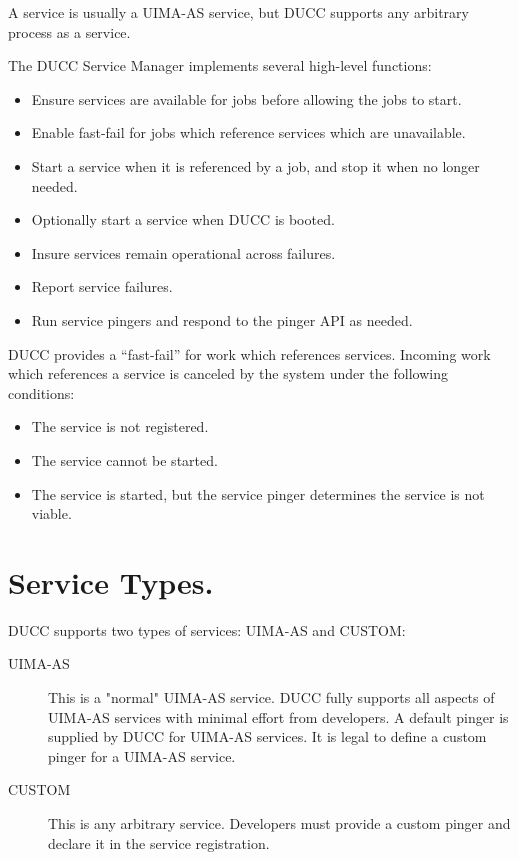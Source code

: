      A service is usually a UIMA-AS service, but DUCC supports any arbitrary process as a service.

      The DUCC Service Manager implements several high-level functions:
      
      \begin{itemize}
          \item Ensure services are available for jobs before allowing the jobs to start.
          \item Enable fast-fail for jobs which reference services which are unavailable.
          \item Start a service when it is referenced by a job, and stop it when no longer needed.
          \item Optionally start a service when DUCC is booted.
          \item Insure services remain operational across failures.
          \item Report service failures.
          \item Run service pingers and respond to the pinger API as needed.
       \end{itemize}

       DUCC provides a ``fast-fail'' for work which references services.  Incoming work which
       references a service is canceled by the system under the following conditions:
       \begin{itemize}
         \item The service is not registered.
         \item The service cannot be started.
         \item The service is started, but the service pinger determines the service is not
           viable.
       \end{itemize}
         
    \section{Service Types.}
    \label{sec:services.types}
      DUCC supports two types of services: UIMA-AS and CUSTOM:
      
      \begin{description}
          \item[UIMA-AS] This is a "normal" UIMA-AS service. DUCC fully supports all aspects of UIMA-AS
            services with minimal effort from developers.  A default pinger is supplied by DUCC
            for UIMA-AS services.  It is legal to define a custom pinger for a UIMA-AS service.
            
          \item[CUSTOM] This is any arbitrary service.  Developers must provide a custom pinger
            and declare it in the service registration.            
      \end{description}

